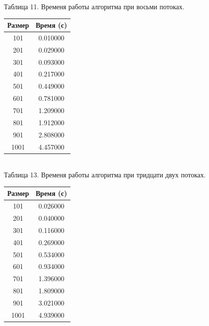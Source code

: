 \documentclass[12pt]{report}
\begin{document}
	\begin{minipage}{0.5\textwidth}
		\begin{center}
			Таблица 11. Временя работы алгоритма при восьми потоках.
			
			\begin{tabular}{|c c|}
				\hline
				Размер & Время (с) \\
				\hline
				101 & 0.010000\\
				\hline
				201 & 0.029000\\
				\hline
				301 & 0.093000\\
				\hline
				401 & 0.217000\\
				\hline
				501 & 0.449000\\
				\hline
				601 & 0.781000\\
				\hline
				701 & 1.209000\\
				\hline
				801 & 1.912000\\
				\hline
				901 & 2.808000\\
				\hline
				1001 & 4.457000\\
				\hline
			\end{tabular}
			
			~\\
			
			Таблица 13. Временя работы алгоритма при тридцати двух потоках.
			
			\begin{tabular}{|c c|}
				\hline
				Размер & Время (с) \\
				\hline
				101 & 0.026000\\
				\hline
				201 & 0.040000\\
				\hline
				301 & 0.116000\\
				\hline
				401 & 0.269000\\
				\hline
				501 & 0.534000\\
				\hline
				601 & 0.934000\\
				\hline
				701 & 1.396000\\
				\hline
				801 & 1.809000\\
				\hline
				901 & 3.021000\\
				\hline
				1001 & 4.939000\\
				\hline
			\end{tabular}
		\end{center}
	\end{minipage}
	
\end{document}
